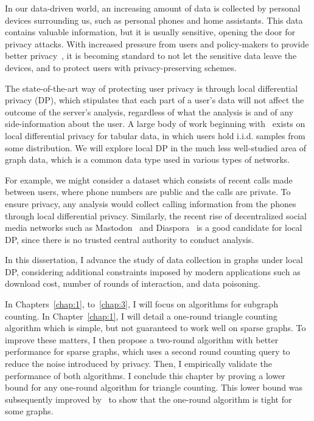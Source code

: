 \documentclass[12pt]{ucsddissertation}
\begin{document}
\begin{dissertationintroduction}
In our data-driven world, an increasing amount of data is collected by personal devices 
surrounding us, such as personal phones and home assistants. This data contains valuable
information, but it is usually sensitive, opening the door for privacy attacks. With
increased pressure from users and policy-makers to provide better privacy~\cite{voigt2017eu}, 
it is becoming standard to not let the sensitive data leave the devices, and to protect users
with privacy-preserving schemes.

The state-of-the-art way of protecting user privacy is through local differential privacy (DP),
which stipulates that each part of a user's data will not affect the outcome of the 
server's analysis, regardless of what the analysis is and of any side-information about
the user. A large body of work beginning with~\cite{Kasiviswanathan_FOCS08} exists on local 
differential privacy for tabular data, in which users hold i.i.d. samples from some distribution.
We will explore local DP in the much less well-studied area of graph data, which 
is a common data type used in various types of networks.

For example, we might consider a dataset which consists of recent calls made between users, where 
phone numbers are public and the calls are private. To ensure privacy, any analysis would collect
calling information from the phones through local differential privacy.
Similarly, the recent rise of decentralized social media networks such as Mastodon~\cite{Mastodon} 
and Diaspora~\cite{Diaspora} is a good candidate for local DP, since there is no trusted 
central authority to conduct analysis.

In this dissertation, I advance the study of data collection in graphs under local DP, 
considering additional constraints imposed by modern applications such as download cost, 
number of rounds of interaction, and data poisoning.

In Chapters~\ref{chap:1}, to~\ref{chap:3}, I will focus on algorithms for subgraph counting.
In Chapter~\ref{chap:1},
I will detail a one-round triangle counting algorithm which is simple, but not guaranteed to work 
well on sparse graphs. To improve these matters,
I then propose a two-round algorithm with better performance 
for sparse graphs, which uses a second round counting query to reduce the noise introduced by privacy.
Then, I empirically validate the performance of both algorithms.
I conclude this chapter by proving a lower bound for any one-round algorithm for triangle
counting. This lower bound was subsequently improved by~\cite{eden2023triangle} to 
show that the one-round algorithm is tight for some graphs.


\end{dissertationintroduction}
\end{document}
